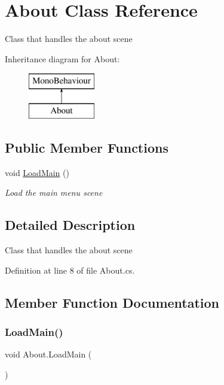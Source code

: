 \hypertarget{class_about}{}\section{About Class Reference}
\label{class_about}


Class that handles the about scene  


Inheritance diagram for About\+:\begin{figure}[H]
\begin{center}
\leavevmode
\includegraphics[height=2.000000cm]{class_about}
\end{center}
\end{figure}
\subsection*{Public Member Functions}
\begin{DoxyCompactItemize}
\item 
void \mbox{\hyperlink{class_about_a02d9d9134bd810ba4a3d5e1190be7545}{Load\+Main}} ()
\begin{DoxyCompactList}\small\item\em Load the main menu scene \end{DoxyCompactList}\end{DoxyCompactItemize}


\subsection{Detailed Description}
Class that handles the about scene 



Definition at line 8 of file About.\+cs.



\subsection{Member Function Documentation}
\mbox{\label{class_about_a02d9d9134bd810ba4a3d5e1190be7545}} 
\subsubsection{\texorpdfstring{Load\+Main()}{LoadMain()}}
{\footnotesize\ttfamily void About.\+Load\+Main (\begin{DoxyParamCaption}{ }\end{DoxyParamCaption})}



